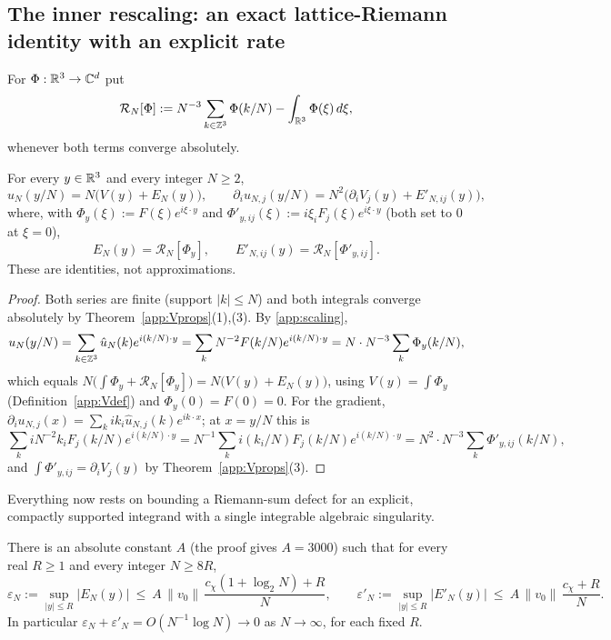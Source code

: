 \subsection{The inner rescaling: an exact lattice-Riemann identity with
an explicit rate}
\label{app:riemann}

For $\Phi:\mathbb R^3\to\mathbb C^d$ put
\[
\mathcal R_N[\Phi]:=N^{-3}\sum_{k\in\mathbb Z^3}\Phi(k/N)
-\int_{\mathbb R^3}\Phi(\xi)\,d\xi ,
\]
whenever both terms converge absolutely.

\begin{lemma}\label{app:innerexact}
For every $y\in\mathbb R^3$ and every integer $N\ge2$,
\[
u_N(y/N)=N\big(V(y)+E_N(y)\big),\qquad
\partial_iu_{N,j}(y/N)=N^2\big(\partial_iV_j(y)+E'_{N,ij}(y)\big),
\]
where, with $\Phi_y(\xi):=F(\xi)e^{i\xi\cdot y}$ and
$\Phi'_{y,ij}(\xi):=i\xi_iF_j(\xi)e^{i\xi\cdot y}$ (both set to $0$ at
$\xi=0$),
\[
E_N(y)=\mathcal R_N[\Phi_y],\qquad
E'_{N,ij}(y)=\mathcal R_N[\Phi'_{y,ij}] .
\]
These are identities, not approximations.
\end{lemma}

\begin{proof}
Both series are finite (support $|k|\le N$) and both integrals converge
absolutely by Theorem~\ref{app:Vprops}(1),(3). By \eqref{app:scaling},
\[
u_N(y/N)=\sum_{k\in\mathbb Z^3}\hat u_N(k)e^{i(k/N)\cdot y}
=\sum_{k}N^{-2}F(k/N)e^{i(k/N)\cdot y}
=N\cdot N^{-3}\sum_k\Phi_y(k/N),
\]
which equals $N\big(\int\Phi_y+\mathcal R_N[\Phi_y]\big)
=N\big(V(y)+E_N(y)\big)$, using $V(y)=\int\Phi_y$
(Definition~\ref{app:Vdef}) and $\Phi_y(0)=F(0)=0$. For the gradient,
$\partial_iu_{N,j}(x)=\sum_kik_i\hat u_{N,j}(k)e^{ik\cdot x}$; at
$x=y/N$ this is
\[
\sum_kiN^{-2}k_iF_j(k/N)e^{i(k/N)\cdot y}
=N^{-1}\sum_ki(k_i/N)F_j(k/N)e^{i(k/N)\cdot y}
=N^{2}\cdot N^{-3}\sum_k\Phi'_{y,ij}(k/N),
\]
and $\int\Phi'_{y,ij}=\partial_iV_j(y)$ by
Theorem~\ref{app:Vprops}(3).
\end{proof}

Everything now rests on bounding a Riemann-sum defect for an explicit,
compactly supported integrand with a single integrable algebraic
singularity.

\begin{theorem}
\label{app:rate}
There is an absolute constant $A$ (the proof gives $A=3000$) such that
for every real $R\ge1$ and every integer $N\ge8R$,
\[
\varepsilon_N:=\sup_{|y|\le R}|E_N(y)|
\ \le\ A\,\|v_0\|\,\frac{c_\chi(1+\log_2N)+R}{N},
\qquad
\varepsilon'_N:=\sup_{|y|\le R}|E'_N(y)|
\ \le\ A\,\|v_0\|\,\frac{c_\chi+R}{N} .
\]
In particular $\varepsilon_N+\varepsilon'_N=O(N^{-1}\log N)\to0$ as
$N\to\infty$, for each fixed $R$.
\end{theorem}

